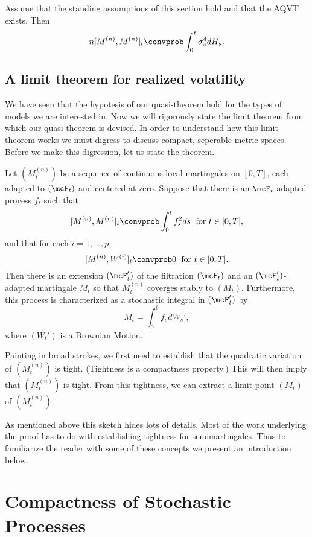 \documentclass{report}
\begin{document}
\begin{proposition}
Assume that the standing assumptions of this section hold and that the
AQVT exists.  Then
\[
n[M^{(n)},M^{(n)}]_t \convprob \int_0^t \sigma_s^4 dH_s.
\]
\end{proposition}


\subsection{A limit theorem for realized volatility}

We have seen that the hypotesis of our quasi-theorem hold for the
types of models we are interested in.  Now we will rigorously state
the limit theorem from which our quasi-theorem is devised.  In order
to understand how this limit theorem works we must digress to discuss
compact, seperable metric spaces.  Before we make this digression, let
us state the theorem.

\begin{theorem}
\label{thelimittheorem}
Let $(M^{(n)}_t)$ be a sequence of continuous local martingales on
$[0,T]$, each adapted to $(\mcF_t)$ and centered at zero.  Suppose
that there is an $\mcF_t$-adapted process $f_t$ such that
\[
[M^{(n)},M^{(n)}]_t \convprob \int_0^t f_s^2 ds \; \textmd{ for } t
\in [0,T],
\]
and that for each $i = 1, \ldots , p$,
\[
[M^{(n)}, W^{(i)}]_t \convprob 0 \; \textmd{ for } t \in [0,T].
\]
Then there is an extension $(\mcF'_t)$ of the filtration $(\mcF_t)$
and an $(\mcF'_t)$-adapted martingale $M_t$ so that $M^{(n)}_t$
coverges stably to $(M_t)$.  Furthermore, this process is
characterized as a stochastic integral in $(\mcF'_t)$ by
\[
M_t = \int_0^t f_s dW_s',
\]
where $(W_t')$ is a Brownian Motion.
\end{theorem}

Painting in broad strokes, we first need to establish that the
quadratic variation of $(M^{(n)}_t)$ is tight.  (Tightness is a
compactness property.)  This will then imply that $(M^{(n)}_t)$ is
tight.  From this tightness, we can extract a limit point $(M_t)$ of
$(M^{(n)}_t)$.  

As mentioned above this sketch hides lots of details.  Most of the
work underlying the proof has to do with establishing tightness for
semimartingales.  Thus to familiarize the reader with some of these
concepts we present an introduction below.

\section{Compactness of Stochastic Processes}
\end{document}
